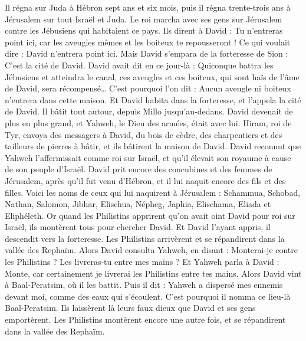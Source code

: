 \begin{multicols}{2}
Il régna sur Juda à Hébron sept ans et six mois, puis il régna trente-trois ans à Jérusalem sur tout Israël et Juda.
Le roi marcha avec ses gens sur Jérusalem contre les Jébusiens qui habitaient ce pays. Ils dirent à David : Tu n'entreras point ici, car les aveugles mêmes et les boiteux te repousseront ! Ce qui voulait dire : David n'entrera point ici.
Mais David s’empara de la forteresse de Sion : C’est la cité de David.
David avait dit en ce jour-là : Quiconque battra les Jébusiens et atteindra le canal, ces aveugles et ces boiteux, qui sont haïs de l’âme de David, sera récompensé… C'est pourquoi l’on dit : Aucun aveugle ni boiteux n'entrera dans cette maison.
Et David habita dans la forteresse, et l'appela la cité de David. Il bâtit tout autour, depuis Millo jusqu'au-dedans.
David devenait de plus en plus grand, et Yahweh, le Dieu des armées, était avec lui.
Hiram, roi de Tyr, envoya des messagers à David, du bois de cèdre, des charpentiers et des tailleurs de pierres à bâtir, et ils bâtirent la maison de David.
David reconnut que Yahweh l'affermissait comme roi sur Israël, et qu'il élevait son royaume à cause de son peuple d'Israël.
David prit encore des concubines et des femmes de Jérusalem, après qu'il fut venu d'Hébron, et il lui naquit encore des fils et des filles.
Voici les noms de ceux qui lui naquirent à Jérusalem : Schammua, Schobad, Nathan, Salomon,
Jibhar, Elischua, Népheg, Japhia,
Elischama, Eliada et Eliphéleth.
Or quand les Philistins apprirent qu'on avait oint David pour roi sur Israël, ils montèrent tous pour chercher David. Et David l’ayant appris, il descendit vers la forteresse.
Les Philistins arrivèrent et se répandirent dans la vallée des Rephaïm.
Alors David consulta Yahweh, en disant : Monterai-je contre les Philistins ? Les livreras-tu entre mes mains ? Et Yahweh parla à David : Monte, car certainement je livrerai les Philistins entre tes mains.
Alors David vint à Baal-Peratsim, où il les battit. Puis il dit : Yahweh a dispersé mes ennemis devant moi, comme des eaux qui s’écoulent. C'est pourquoi il nomma ce lieu-là Baal-Peratsim.
Ils laissèrent là leurs faux dieux que David et ses gens emportèrent.
Les Philistins montèrent encore une autre fois, et se répandirent dans la vallée des Rephaïm.

\end{multicols}
